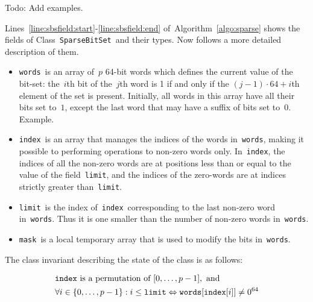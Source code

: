 \documentclass[a4paper,11pt]{article}
\newcommand{\Todo}[1]{{\color{blue}#1}}
\newcommand{\Algoref}[1]{Algorithm~\ref{#1}}
\newcommand{\Linesref}[2]{Lines~\ref{#1}-\ref{#2}}
\newcommand{\Words}{\texttt{words}}
\newcommand{\Index}{\texttt{index}}
\newcommand{\Mask}{\texttt{mask}}
\newcommand{\Limit}{\texttt{limit}}
\newcommand{\SparseBitSet}{\texttt{SparseBitSet}}
\numberwithin{equation}{section}
\begin{document}
\Todo{Todo: Add examples.}

\Linesref{line:sbsfield:start}{line:sbsfield:end} of~\Algoref{algo:sparse} shows the fields
of Class~\SparseBitSet~and their types. Now follows a more detailed description of them.

\begin{itemize}
  \item \Words~is an array of~$p$ 64-bit words which defines the current value of the bit-set:
    the~$i$th bit of the~$j$th word is 1 if and only if the $(j-1) \cdot 64 + i$th element of
    the set is present. Initially, all words in this array have all their bits set to~$1$,
    except the last word that may have a suffix of bits set to~$0$. \Todo{Example.}

  \item \Index~is an array that manages the indices of the words in~\Words,
    making it possible to performing operations to non-zero words only.
    In~\Index, the
    indices of all the non-zero words are at positions less than or
    equal to the value of the field~\Limit, and the indices of the zero-words are
    at indices strictly greater than~\Limit. 

  \item \Limit~is the index of~\Index~corresponding to the last non-zero word in~\Words.
    Thus it is one smaller than the number of non-zero words in~\Words.

  \item \Mask~is a local temporary array that is used to modify the bits in~\Words.
    
\end{itemize}

\noindent
The class invariant describing the state of the class is as follows:

\begin{alignat}{1}
  \label{eq:invariant}
  &\Index~\text{is a permutation of~} [0,\dots,p-1],\text{~and} \\
  &\forall i \in \Set{0,\dots,p-1}: i \leq \Limit \Leftrightarrow \Words[\Index[i]] \neq 0^{64}
\end{alignat}
\end{document}
